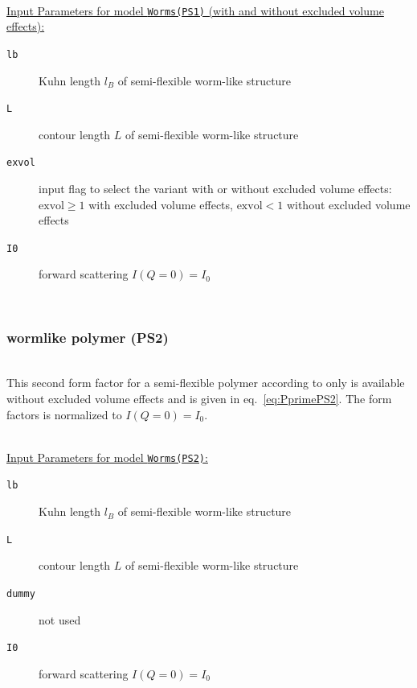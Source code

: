 \vspace{5mm}

\hspace{1pt}\\
\underline{Input Parameters for model \texttt{Worms(PS1)} (with and without excluded volume effects):}\\
\begin{description}
\item[\texttt{lb}] Kuhn length $l_B$ of semi-flexible worm-like structure
\item[\texttt{L}] contour length $L$ of semi-flexible worm-like structure
\item[\texttt{exvol}] input flag to select the variant with or without excluded volume effects: $\mathrm{exvol} \geq 1$ with excluded volume effects, $\mathrm{exvol} < 1$ without excluded volume effects
\item[\texttt{I0}] forward scattering $I(Q=0)=I_0$
\end{description}

\vphantom{.}~\\

\subsubsection{wormlike polymer (PS2)}
\label{sect:ffWorm(PS2)}
~\\
This second form factor for a semi-flexible polymer  according to \cite{Pedersen96Macrom} only is available without excluded volume effects and is given in eq.\ \ref{eq:PprimePS2}. The form factors is normalized to $I(Q=0)=I_0$.

\vspace{5mm}

\hspace{1pt}\\
\underline{Input Parameters for model \texttt{Worms(PS2)}:}\\
\begin{description}
\item[\texttt{lb}] Kuhn length $l_B$ of semi-flexible worm-like structure
\item[\texttt{L}] contour length $L$ of semi-flexible worm-like structure
\item[\texttt{dummy}] not used
\item[\texttt{I0}] forward scattering $I(Q=0)=I_0$
\end{description}

\vphantom{.}~\\

